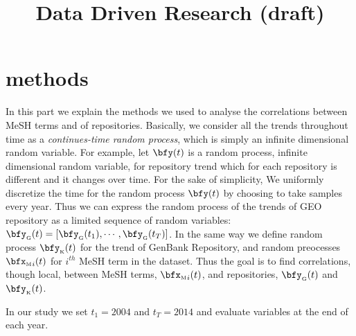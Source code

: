 \documentclass[twoside,11pt]{article}
\def\bfyg{\bfy_{\text{\tiny G}}}
\def\bfyk{\bfy_{\text{\tiny K}}}
\def\bfxm{{\bfx_{\text{\tiny M}}}}
\begin{document}
\title{Data Driven Research (draft)}



\maketitle



\section{methods} 
In this part we explain the methods we used to analyse the correlations between MeSH terms and of repositories.
Basically, we consider all the trends throughout time as a \emph{continues-time random process}, which is simply an infinite dimensional random variable. For example, let $\bfy(t)$ is a random process, infinite dimensional random variable, for repository trend which for each repository is different and it changes over time. For the sake of simplicity, We uniformly discretize the time for the random process $\bfy(t)$ by choosing to take samples every year. Thus we can express the random process of the trends of GEO repository as a limited sequence of random variables: $\bfyg (t) = [\bfyg(t_1), \cdots, \bfyg(t_T) ]$.  In the same way we define random process $\bfyk(t)$ for the trend  of GenBank Repository, and random preocesses $\bfxm_i(t)$ for $i^{th}$ MeSH term in the dataset. Thus the goal is to find correlations, though local, between MeSH terms, $\bfxm_i(t)$, and repositories, $\bfyg(t)$ and $\bfyk(t)$.

In our study we set $t_1=2004$ and $t_T=2014$ and evaluate variables at the end of each year.
\end{document}
